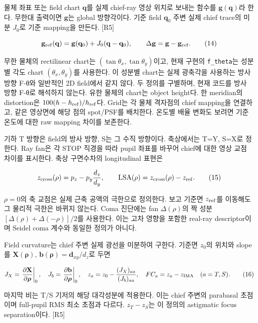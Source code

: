 \documentclass[
  a4paper,
]{article}
\begin{document}
물체 좌표 또는 field chart \(\mathbf q\)를 실제 chief-ray 영상 위치로
보내는 함수를 \(\mathbf g(\mathbf q)\)라 한다. 무한대 출력이면
\(\mathbf g\)는 global 방향각이다. 기준 field \(\mathbf q_0\) 주변 실제
chief trace의 미분 \(J_0\)로 기준 mapping을 만든다. {[}R5{]}

\[
\mathbf g_{\rm ref}(\mathbf q)=\mathbf g(\mathbf q_0)+J_0(\mathbf q-\mathbf q_0),
\qquad\Delta\mathbf g=\mathbf g-\mathbf g_{\rm ref}.
\tag{14}
\]

무한 물체의 rectilinear chart는 \((\tan\theta_x,\tan\theta_y)\)이고, 현재 구현의
\texttt{f\_theta}는 성분별 각도 chart \((\theta_x,\theta_y)\)를 사용한다.
이 성분별 chart는 실제 광축각을 사용하는 방사 방향 F-θ와 일반적인 2D field에서 같지 않다.
두 정의를 구별하며, 현재 코드를 방사 방향 F-θ로 해석하지 않는다.
유한 물체의 chart는 object height다. 한
meridian의 distortion은 \(100(h-h_{\rm ref})/h_{\rm ref}\)다. Grid는 각
물체 격자점의 chief mapping을 연결하고, 같은 영상면에 해당 점의
spot/PSF를 배치한다. 온도별 배율 변화도 보려면 기준 온도에 대한 raw
mapping 차이를 보존한다.

기하 T 방향은 field의 방사 방향, S는 그 수직 방향이다. 축상에서는 T=Y,
S=X로 정한다. Ray fan은 각 STOP 직경을 따라 pupil 좌표를 바꾸어 chief에
대한 영상 교점 차이를 표시한다. 축상 구면수차의 longitudinal 표현은

\[
z_{\rm cross}(\rho)=p_z-p_y\frac{d_z}{d_y},\qquad
\mathrm{LSA}(\rho)=z_{\rm cross}(\rho)-z_{\rm ref}.
\tag{15}
\]

\(\rho=0\)의 축 교점은 실제 근축 공액의 극한으로 정의한다. 보고 기준면
\(z_{\rm ref}\)를 이동해도 그 물리적 극한은 바뀌지 않는다. Coma 진단에는
fan \(\Delta(\rho)\)의 짝 성분 \([\Delta(\rho)+\Delta(-\rho)]/2\)를
사용한다. 이는 고차 영향을 포함한 real-ray descriptor이며 Seidel coma
계수와 동일한 정의가 아니다.

Field curvature는 chief 주변 실제 광선을 미분하여 구한다. 기준면
\(z_0\)의 위치와 slope를 \(\mathbf X(\boldsymbol\rho)\),
\(\mathbf b(\boldsymbol\rho)=\mathbf d_{xy}/d_z\)로 두면

\[
J_X=\left.\frac{\partial\mathbf X}{\partial\boldsymbol\rho}\right|_0,
\quad J_b=\left.\frac{\partial\mathbf b}{\partial\boldsymbol\rho}\right|_0,
\quad z_a=z_0-\frac{(J_X)_{aa}}{(J_b)_{aa}},
\quad FC_a=z_a-z_{\rm IMA}\quad(a=T,S).
\tag{16}
\]

마지막 비는 T/S 기저의 해당 대각성분에 적용한다. 이는 chief 주변의
parabasal 초점이며 full-pupil RMS 최소 초점과 다르다. \(z_T-z_S\)는 이
정의의 astigmatic focus separation이다. {[}R5{]}
\end{document}
